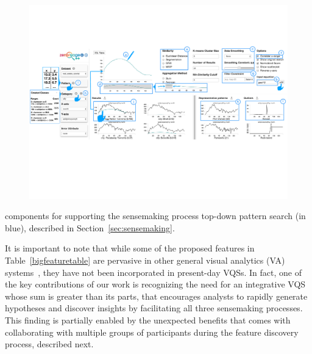 {  \begin{figure}[ht!]
    \centering
    \vspace{-5pt}
    \includegraphics[width=0.9\linewidth]{figures/zvpp_system.pdf} %
    \vspace{-5pt}\caption{}
    \label{zvOverview}
    \vspace*{-15pt}
  \end{figure}
  components for supporting the sensemaking process top-down pattern search (in blue), described in Section~\ref{sec:sensemaking}.
  \par It is important to note that while some of the proposed features in Table~\ref{bigfeaturetable} are pervasive in other general visual analytics (VA) systems~\cite{Heer2012,Amar2005}, they have not been incorporated in present-day VQSs. In fact, one of the key contributions of our work is recognizing the need for an integrative VQS whose sum is greater than its parts, that encourages analysts to rapidly generate hypotheses and discover insights by facilitating all three sensemaking processes. This finding is partially enabled by the unexpected benefits that comes with collaborating with multiple groups of participants during the feature discovery process, described next.
}
